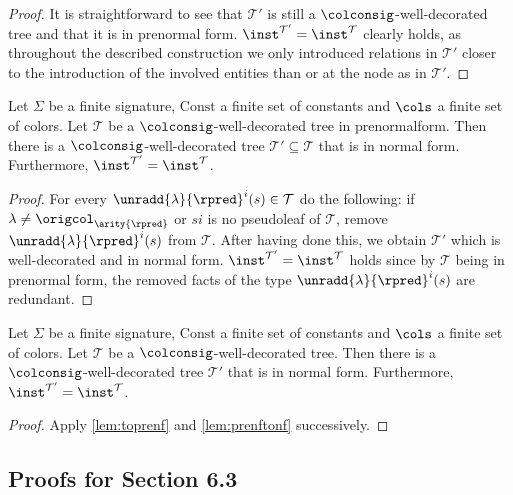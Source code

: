\begin{proof}
	It is straightforward to see that $\mathcal{T}'$ is still a $\colconsig$-well-decorated tree and that it is in prenormal form.
	$\inst^{\mathcal{T}'}=\inst^{\mathcal{T}}$ clearly holds, as throughout the described construction we only introduced relations in $\mathcal{T}'$ closer to the introduction of the involved entities than or at the node as in $\mathcal{T}'$. %
\end{proof}
\begin{lemma}\label{lem:prenftonf}
	Let $\Sigma$ be a finite signature, $\mathrm{Const}$ a finite set of constants and $\cols$ a finite set of colors. Let $\mathcal{T}$ be a $\colconsig$-well-decorated tree in prenormalform. Then there is a  $\colconsig$-well-decorated tree $\mathcal{T}'\subseteq \mathcal{T}$ that is in normal form. Furthermore, $\inst^{\mathcal{T}'} = \inst^{\mathcal{T}}$.
\end{lemma}
\begin{proof}
	For every $\unradd{\lambda}{\rpred}^{i}(s)\in\mathcal{T}$ do the following:
	if $\lambda\neq\origcol_{\arity{\rpred}}$ or $si$ is no pseudoleaf of $\mathcal{T}$, remove $\unradd{\lambda}{\rpred}^{i}(s)$ from $\mathcal{T}$. After having done this, we obtain $\mathcal{T}'$ which is well-decorated and in normal form.
	$\inst^{\mathcal{T}'} = \inst^{\mathcal{T}}$ holds since by $\mathcal{T}$ being in prenormal form, the removed facts of the type $\unradd{\lambda}{\rpred}^{i}(s)$ are redundant.
\end{proof}
\begin{corollary}\label{cor:tonf}
	Let $\Sigma$ be a finite signature, $\mathrm{Const}$ a finite set of constants and $\cols$ a finite set of colors. Let $\mathcal{T}$ be a $\colconsig$-well-decorated tree. Then there is a  $\colconsig$-well-decorated tree $\mathcal{T}'$ that is in normal form. Furthermore, $\inst^{\mathcal{T}'} = \inst^{\mathcal{T}}$.
\end{corollary}
\begin{proof}
	Apply \cref{lem:toprenf} and \cref{lem:prenftonf} successively.
\end{proof}
\vspace{-0.3ex}

\subsection{Proofs for Section 6.3}

